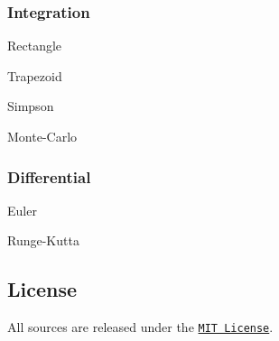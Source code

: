 \subsubsection*{Integration}


\begin{DoxyItemize}
\item Rectangle
\item Trapezoid
\item Simpson
\item Monte-\/\+Carlo
\end{DoxyItemize}

\subsubsection*{Differential}


\begin{DoxyItemize}
\item Euler
\item Runge-\/\+Kutta
\end{DoxyItemize}

\subsection*{License}

All sources are released under the \href{http://www.opensource.org/licenses/MIT}{\tt M\+IT License}. 